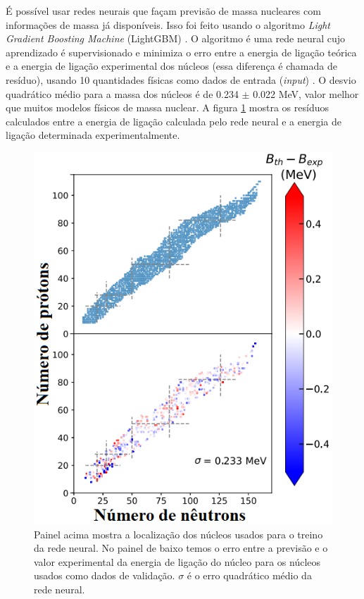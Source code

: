 \documentclass[a4paper,12pt,oneside]{book}
\begin{document}
\begin{appendices}
\par É possível usar redes neurais que façam previsão de massa nucleares com informações de massa já disponíveis. Isso foi feito usando o algoritmo \textit{Light Gradient Boosting Machine} (LightGBM) \cite{LightGBM}. O algoritmo é uma rede neural cujo aprendizado é supervisionado e minimiza o erro entre a energia de ligação teórica e a energia de ligação experimental dos núcleos (essa diferença é chamada de resíduo), usando 10 quantidades físicas como dados de entrada (\textit{input}) \cite{nuclear_mass}. O desvio quadrático médio para a massa dos núcleos é de 0.234 $\pm$ 0.022 MeV, valor melhor que muitos modelos físicos de massa nuclear. A figura \ref{fig:nuclei_mass_ml} mostra os resíduos calculados entre a energia de ligação calculada pelo rede neural e a energia de ligação determinada experimentalmente.

\begin{figure}[H]
    \centering
    \includegraphics[scale = 0.60]{figs/nuclei_mass.png}
    \caption{Painel acima mostra a localização dos núcleos usados para o treino da rede neural. No painel de baixo temos o erro entre a previsão e o valor experimental da energia de ligação do núcleo para os núcleos usados como dados de validação. $\sigma$ é o erro quadrático médio da rede neural.}
    \label{fig:nuclei_mass_ml}
\end{figure}


\end{appendices}
\end{document}
